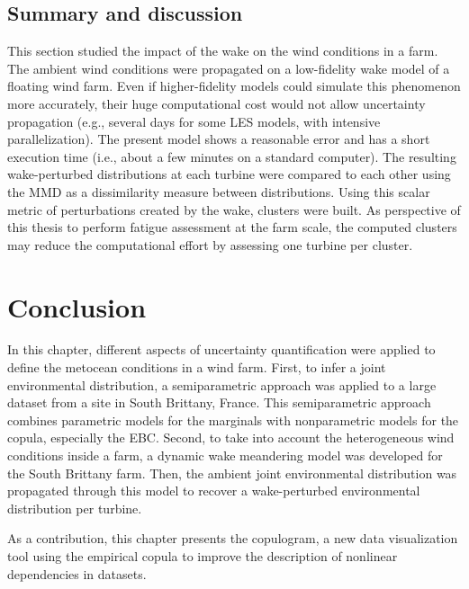 \subsection{Summary and discussion}
This section studied the impact of the wake on the wind conditions in a farm. 
The ambient wind conditions were propagated on a low-fidelity wake model of a floating wind farm. 
Even if higher-fidelity models could simulate this phenomenon more accurately, their huge computational cost would not allow uncertainty propagation (e.g., several days for some LES models, with intensive parallelization). 
The present model shows a reasonable error and has a short execution time (i.e., about a few minutes on a standard computer). 
The resulting wake-perturbed distributions at each turbine were compared to each other using the MMD as a dissimilarity measure between distributions. 
Using this scalar metric of perturbations created by the wake, clusters were built.  
As perspective of this thesis to perform fatigue assessment at the farm scale, the computed clusters may reduce the computational effort by assessing one turbine per cluster.    


\section{Conclusion}

In this chapter, different aspects of uncertainty quantification were applied to define the metocean conditions in a wind farm. 
First, to infer a joint environmental distribution, a semiparametric approach was applied to a large dataset from a site in South Brittany, France. 
This semiparametric approach combines parametric models for the marginals with nonparametric models for the copula, especially the EBC.  
Second, to take into account the heterogeneous wind conditions inside a farm, a dynamic wake meandering model was developed for the South Brittany farm. 
Then, the ambient joint environmental distribution was propagated through this model to recover a wake-perturbed environmental distribution per turbine.  

As a contribution, this chapter presents the copulogram, a new data visualization tool using the empirical copula to improve the description of nonlinear dependencies in datasets.  

